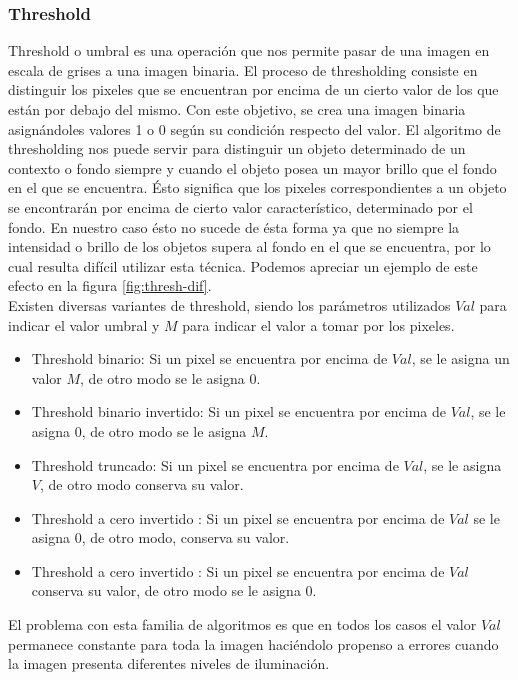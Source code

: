 	\subsubsection{\label{sec:thresh} Threshold}
Threshold o umbral es una operaci\'on que nos permite pasar de una 
imagen en escala de grises a una imagen binaria. El proceso de 
thresholding consiste en distinguir los pixeles que se encuentran por 
encima de un cierto valor de los que est\'an por debajo del mismo. Con 
este objetivo, se crea una imagen binaria asign\'andoles valores 1 o 0 
seg\'un su condici\'on respecto del valor. El algoritmo de thresholding 
nos puede servir para distinguir un objeto determinado de un contexto o 
fondo siempre y cuando el objeto posea un mayor brillo que el fondo en 
el que se encuentra. \'Esto significa que los pixeles correspondientes a 
un objeto se encontrar\'an por encima de cierto valor caracter\'istico, 
determinado por el fondo. En nuestro caso \'esto no sucede de \'esta forma ya que no siempre la intensidad o brillo de los objetos supera al fondo en el que se encuentra, por lo cual resulta dif\'icil utilizar esta t\'ecnica. Podemos apreciar un ejemplo de este efecto en la figura \ref{fig:thresh-dif}. \\
\indent Existen diversas variantes de threshold, siendo los par\'ametros 
utilizados $Val$ para indicar el valor umbral y $M$ para indicar el 
valor a tomar por los pixeles.
\begin{itemize}
\item{ Threshold binario:  Si un pixel se encuentra por encima de $Val$, se le asigna un valor $M$, de otro modo se le asigna $0$.}
\item{ Threshold binario invertido:  Si un pixel se encuentra por encima de $Val$, se le asigna 0, de otro modo se le asigna $M$.}
\item{ Threshold truncado:  Si un pixel se encuentra por encima de $Val$, se le asigna $V$, de otro modo conserva su valor.}
\item{ Threshold a cero invertido : Si un pixel se encuentra por encima de $Val$ se le asigna $0$, de otro modo, conserva su valor.}
\item{ Threshold a cero invertido : Si un pixel se encuentra por encima de $Val$ conserva su valor, de otro modo se le asigna $0$.}
\end{itemize}
El problema con esta familia de algoritmos es que en todos los casos el 
valor $Val$ permanece constante para toda la imagen haci\'endolo propenso 
a errores cuando la imagen presenta diferentes niveles de iluminaci\'on. 
